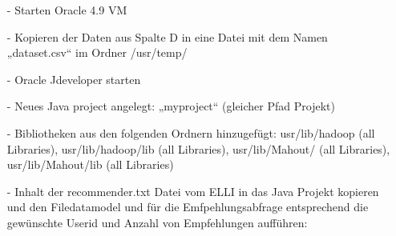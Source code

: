\begin{itemize}
\item[-] Starten Oracle 4.9 VM

\item[-] Kopieren der Daten aus Spalte D in eine Datei mit dem Namen „dataset.csv“ im Ordner /usr/temp/

\item[-] Oracle Jdeveloper starten

\item[-] Neues Java project angelegt: „myproject“ (gleicher Pfad Projekt)

\item[-] Bibliotheken aus den folgenden Ordnern hinzugefügt:
usr/lib/hadoop (all Libraries),
usr/lib/hadoop/lib (all Libraries),
usr/lib/Mahout/ (all Libraries),
usr/lib/Mahout/lib (all Libraries)

\item[-] Inhalt der recommender.txt Datei vom ELLI in das Java Projekt kopieren und den Filedatamodel und für die Emfpehlungsabfrage entsprechend die gewünschte Userid und Anzahl von Empfehlungen aufführen:
\end{itemize}

